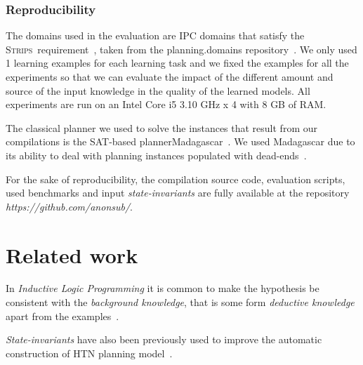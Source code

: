 \documentclass{article}
\newcommand{\strips}{\textsc{Strips}}
\begin{document}
\subsubsection{Reproducibility}
The domains used in the evaluation are IPC domains that satisfy the \strips\ requirement~\cite{fox2003pddl2}, taken from the {\sc planning.domains} repository~\cite{muise2016planning}. We only used 1 learning examples for each learning task and we fixed the examples for all the experiments so that we can evaluate the impact of the different amount and source of the input knowledge in the quality of the learned models. All experiments are run on an Intel Core i5 3.10 GHz x 4 with 8 GB of RAM.

The classical planner we used to solve the instances that result from our compilations is the SAT-based planner{\sc Madagascar}~\cite{rintanen2014madagascar}. We used {\sc Madagascar} due to its ability to deal with planning instances populated with dead-ends~\cite{lopez2015deterministic}.

For the sake of reproducibility, the compilation source code, evaluation scripts, used benchmarks and input {\em state-invariants} are fully available at the repository {\em https://github.com/anonsub/}.


\section{Related work}
\label{sec:related}
In {\em Inductive Logic Programming} it is common to make the hypothesis be consistent with the {\em background knowledge}, that is some form {\em deductive knowledge} apart from the examples~\cite{muggleton1994inductive}.

{\em State-invariants} have also been previously used to improve the automatic construction of HTN planning model~\cite{lotinac2016constructing}.
\end{document}
